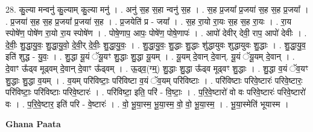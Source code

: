 \documentclass[17pt]{extarticle}
\begin{document}
28. कु॒ल्या मन्वनु॑ कु॒ल्याम् कु॒ल्या मनु॑ । . अनु॑ स॒ह स॒हा न्वनु॑ स॒ह । . स॒ह प्र॒जया᳚ प्र॒जया॑ स॒ह स॒ह प्र॒जया᳚ । . प्र॒जया॑ स॒ह स॒ह प्र॒जया᳚ प्र॒जया॑ स॒ह । . प्र॒जयेति॑ प्र - जया᳚ । . स॒ह रा॒यो रा॒यः स॒ह स॒ह रा॒यः । . रा॒य स्पोषे॑ण॒ पोषे॑ण रा॒यो रा॒य स्पोषे॑ण । . पोषे॒णाप॒ आपः॒ पोषे॑ण॒ पोषे॒णापः॑ । . आपो॑ देवीर् देवी॒ राप॒ आपो॑ देवीः । . दे॒वीः॒ शु॒द्धा॒यु॒वः॒ शु॒द्धा॒यु॒वो॒ दे॒वी॒र् दे॒वीः॒ शु॒द्धा॒यु॒वः॒ । . शु॒द्धा॒यु॒वः॒ शु॒द्धाः शु॒द्धाः शु॑द्धायुवः शुद्धायुवः शु॒द्धाः । . शु॒द्धा॒यु॒व॒ इति॑ शुद्ध - यु॒वः॒ । . शु॒द्धा यू॒यं ॅयू॒यꣳ शु॒द्धाः शु॒द्धा यू॒यम् । . यू॒यम् दे॒वान् दे॒वान्. यू॒यं ॅयू॒यम् दे॒वान् । . दे॒वाꣳ ऊ᳚ढ्व मूढ्वम् दे॒वान् दे॒वाꣳ ऊ᳚ढ्वम् । . ऊ॒ढ्व॒(ग्म्॒) शु॒द्धाः शु॒द्धा ऊ᳚ढ्व मूढ्वꣳ शु॒द्धाः । . शु॒द्धा व॒यं ॅव॒यꣳ शु॒द्धाः शु॒द्धा व॒यम् । . व॒यम् परि॑विष्टाः॒ परि॑विष्टा व॒यं ॅव॒यम् परि॑विष्टाः । . परि॑विष्टाः परिवे॒ष्टारः॑ परिवे॒ष्टारः॒ परि॑विष्टाः॒ परि॑विष्टाः परिवे॒ष्टारः॑ । . परि॑विष्टा॒ इति॒ परि॑ - वि॒ष्टाः॒ । . प॒रि॒वे॒ष्टारो॑ वो वः परिवे॒ष्टारः॑ परिवे॒ष्टारो॑ वः । . प॒रि॒वे॒ष्टार॒ इति॑ परि - वे॒ष्टारः॑ । . वो॒ भू॒या॒स्म॒ भू॒या॒स्म॒ वो॒ वो॒ भू॒या॒स्म॒ । . भू॒या॒स्मेति॑ भूयास्म । \newline

\textbf{Ghana Paata } \newline
\end{document}
